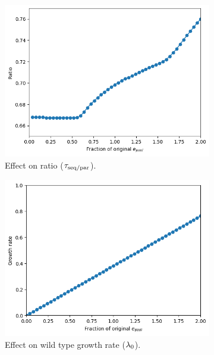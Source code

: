 \begin{figure}
  \centering
  \begin{subfigure}[htpb]{0.45\textwidth}
   \centering
   \includegraphics[width=\textwidth]{epool_ec_ratio_shrinkyaxis}
   \caption{
     Effect on ratio ($\tau_{\mathrm{seq}/\mathrm{par}}$).
   }
   \label{fig:model-pool-ratio}
  \end{subfigure}
  \begin{subfigure}[htpb]{0.45\textwidth}
   \centering
   \includegraphics[width=\textwidth]{epool_ec_gr}
   \caption{
     Effect on wild type growth rate ($\lambda_{0}$).
   }
   \label{fig:model-pool-growthrate}
  \end{subfigure}
  \begin{subfigure}[htpb]{0.45\textwidth}

\end{subfigure}
\end{figure}
